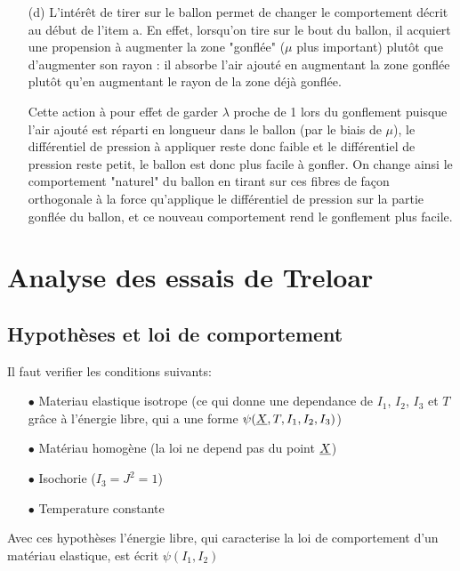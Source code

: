 \documentclass[a4paper,11pt]{article}
\begin{document}
\begin{enumerate}
\hspace{0.8cm}Les deux autres lois sont quasi-identiques en comportement, elles diffèrent seulement dans les valeurs, les valeurs de la loi de Gent étant supérieures à celle de la loi de Langevin.

\item[(d)]
L'intérêt de tirer sur le ballon permet de changer le comportement décrit au début de l'item a. En effet, lorsqu'on tire sur le bout du ballon, il acquiert une propension à augmenter la zone "gonflée" ($\mu$ plus important) plutôt que d'augmenter son rayon : il absorbe l'air ajouté en augmentant la zone gonflée plutôt qu'en augmentant le rayon de la zone déjà gonflée.

\hspace{0.8cm}Cette action à pour effet de garder $\lambda$ proche de 1 lors du gonflement puisque l'air ajouté est réparti en longueur dans le ballon (par le biais de $\mu$), le différentiel de pression à appliquer reste donc faible et le différentiel de pression reste petit, le ballon est donc plus facile à gonfler. On change ainsi le comportement "naturel" du ballon en tirant sur ces fibres de façon orthogonale à la force qu'applique le différentiel de pression sur la partie gonflée du ballon, et ce nouveau comportement rend le gonflement plus facile.
\end{enumerate}

\clearpage

\section{Analyse des essais de Treloar}
\subsection{Hypothèses et loi de comportement}

Il faut verifier les conditions suivants:

\begin{itemize}
	\item[$\bullet$] Materiau elastique isotrope (ce qui donne une dependance de $I_1$, $I_2$, $I_3$ et $T$ gr\^ace \`a l'énergie libre, qui a une forme $\displaystyle\psi(\uline{X},T,I_1,I_2,I_3)$)
	\item[$\bullet$]Mat\'eriau homog\`ene (la loi ne depend pas du point $\uline{X}$)
	\item[$\bullet$] Isochorie ($I_3 =J^2=1$)
	\item[$\bullet$] Temperature constante
	
\end{itemize}
Avec ces hypothèses l'énergie libre, qui caracterise la loi de comportement d'un mat\'eriau elastique, est écrit $\psi(I_1,I_2)$
\end{document}
